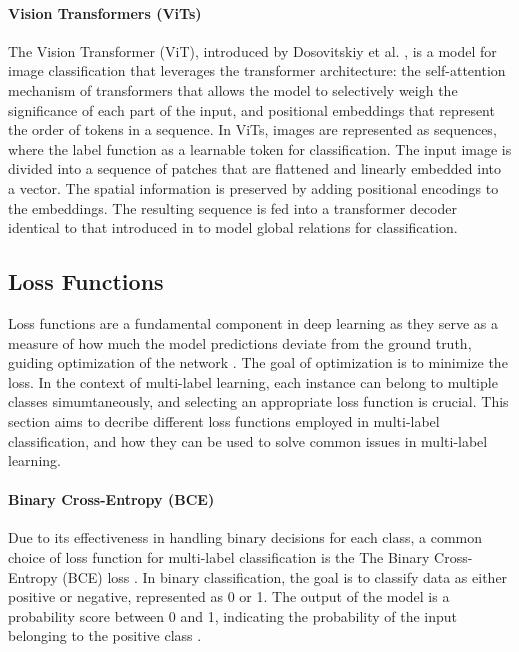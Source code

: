 \documentclass[lettersize,journal]{IEEEtran}
\begin{document}
\paragraph{Vision Transformers (ViTs)}
The Vision Transformer (ViT), introduced by Dosovitskiy et al. \cite{dosovitskiy2021imageworth16x16words}, is a model for image classification that leverages the transformer architecture: the self-attention mechanism of transformers that allows the model to selectively weigh the significance of each part of the input, and positional embeddings that represent the order of tokens in a sequence. In ViTs, images are represented as sequences, where the label function as a learnable token for classification. The input image is divided into a sequence of patches that are flattened and linearly embedded into a vector. The spatial information is preserved by adding positional encodings to the embeddings. The resulting sequence is fed into a transformer decoder identical to that introduced in \cite{vaswani2023attentionneed} to model global relations for classification.

\subsection{Loss Functions}
Loss functions are a fundamental component in deep learning as they serve as a measure of how much the model predictions deviate from the ground truth, guiding optimization of the network \cite{zhang2023dive}. The goal of optimization is to minimize the loss. In the context of multi-label learning, each instance can belong to multiple classes simumtaneously, and selecting an appropriate loss function is crucial. This section aims to decribe different loss functions employed in multi-label classification, and how they can be used to solve common issues in multi-label learning.

\paragraph{Binary Cross-Entropy (BCE)}
Due to its effectiveness in handling binary decisions for each class, a common choice of loss function for multi-label classification is the The Binary Cross-Entropy (BCE) loss \cite{mlsp,durand2019learningdeepconvnetmultilabel,nayan2024binary}. In binary classification, the goal is to classify data as either positive or negative, represented as 0 or 1. The output of the model is a probability score between 0 and 1, indicating the probability of the input belonging to the positive class \cite{nayan2024binary}.
\end{document}
